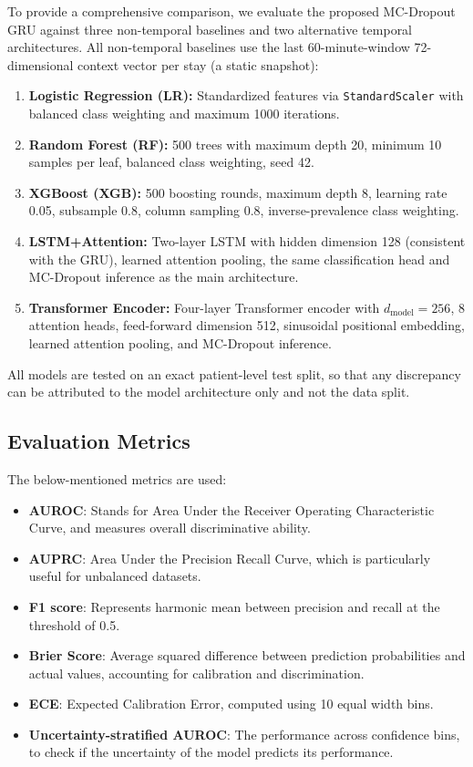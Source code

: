 \documentclass[runningheads]{llncs}
\begin{document}
To provide a comprehensive comparison, we evaluate the proposed MC-Dropout GRU against three non-temporal baselines and two alternative temporal architectures. All non-temporal baselines use the last 60-minute-window 72-dimensional context vector per stay (a static snapshot):

\begin{enumerate}
    \item \textbf{Logistic Regression (LR):} Standardized features via \texttt{StandardScaler} with balanced class weighting and maximum 1000 iterations.
    \item \textbf{Random Forest (RF):} 500 trees with maximum depth 20, minimum 10 samples per leaf, balanced class weighting, seed 42.
    \item \textbf{XGBoost (XGB):} 500 boosting rounds, maximum depth 8, learning rate 0.05, subsample 0.8, column sampling 0.8, inverse-prevalence class weighting.
    \item \textbf{LSTM+Attention:} Two-layer LSTM with hidden dimension 128 (consistent with the GRU), learned attention pooling, the same classification head and MC-Dropout inference as the main architecture.
    \item \textbf{Transformer Encoder:} Four-layer Transformer encoder with $d_\text{model}=256$, 8 attention heads, feed-forward dimension 512, sinusoidal positional embedding, learned attention pooling, and MC-Dropout inference.
\end{enumerate}

All models are tested on an exact patient-level test split, so that any discrepancy can be attributed to the model architecture only and not the data split.

\subsection{Evaluation Metrics}

The below-mentioned metrics are used:
\begin{itemize}
    \item \textbf{AUROC}: Stands for Area Under the Receiver Operating Characteristic Curve, and measures overall discriminative ability.
    \item \textbf{AUPRC}: Area Under the Precision Recall Curve, which is particularly useful for unbalanced datasets.
    \item \textbf{F1 score}: Represents harmonic mean between precision and recall at the threshold of 0.5.
    \item \textbf{Brier Score}: Average squared difference between prediction probabilities and actual values, accounting for calibration and discrimination.
    \item \textbf{ECE}: Expected Calibration Error, computed using 10 equal width bins.
    \item \textbf{Uncertainty-stratified AUROC}: The performance across confidence bins, to check if the uncertainty of the model predicts its performance.
\end{itemize}
\end{document}
